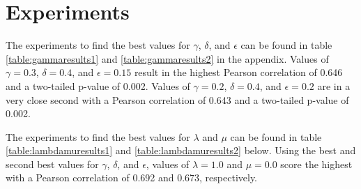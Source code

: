 \documentclass{article}
\begin{document}





\section{Experiments} \label{sec:experiments}

The experiments to find the best values for $\gamma$, $\delta$, and $\epsilon$ can be found in table \ref{table:gammaresults1} and \ref{table:gammaresults2} in the appendix. Values of $\gamma = 0.3$, $\delta = 0.4$, and $\epsilon = 0.15$ result in the highest Pearson correlation of 0.646 and a two-tailed p-value of 0.002. Values of $\gamma = 0.2$, $\delta = 0.4$, and $\epsilon = 0.2$ are in a very close second with a Pearson correlation of 0.643 and a two-tailed p-value of 0.002. 

The experiments to find the best values for $\lambda$ and $\mu$ can be found in table \ref{table:lambdamuresults1} and \ref{table:lambdamuresults2} below. Using the best and second best values for $\gamma$, $\delta$, and $\epsilon$, values of $\lambda = 1.0$ and $\mu = 0.0$ score the highest with a Pearson correlation of 0.692 and 0.673, respectively. 
\end{document}
